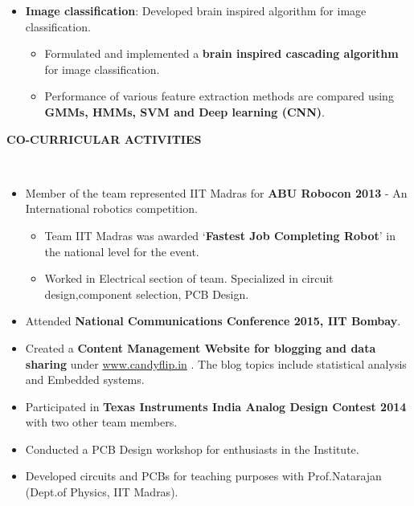 \documentclass[a4paper,10pt]{article}
\newcommand{\lsep}{-0.5cm}
\newcommand{\resheading}[1]{{\small \colorbox{mygrey}{\begin{minipage}{0.975\textwidth}{\textbf{#1 \vphantom{p\^{E}}}}\end{minipage}}}}
\begin{document}
\begin{itemize}
        \vspace{-5pt}
        \item \textbf{Image classification}: Developed brain inspired algorithm for image classification.
        \begin{itemize}
        \vspace{-5pt}
            \item Formulated and implemented a \textbf{brain inspired cascading algorithm} for image classification.
            \item Performance of various feature extraction methods are compared using \textbf{GMMs, HMMs, SVM and Deep learning (CNN)}.            
        \end{itemize}
    \end{itemize}


\resheading{\textbf{CO-CURRICULAR ACTIVITIES} }\\[\lsep]
    \begin{itemize}
        \item Member of the team represented IIT Madras for \textbf{ABU Robocon 2013} - An International robotics competition.
        \begin{itemize}
            \vspace{-5pt}
            \item Team IIT Madras was awarded `\textbf{Fastest Job Completing Robot}' in the national level for the event.
            \item  Worked in Electrical section of team. Specialized in circuit design,component selection, PCB Design.
            \vspace{-5pt}
        \end{itemize}
        \item Attended \textbf{National Communications Conference 2015, IIT Bombay}.
        \vspace{-5pt}
        \item Created a \textbf{Content Management Website for blogging and data sharing} under \hspace{3pt}\url{www.candyflip.in} . The blog topics include statistical analysis and Embedded systems.
        \vspace{-5pt}
        \item Participated in \textbf{Texas Instruments India Analog Design Contest 2014} with two other team members.
        \vspace{-5pt}       
        \item Conducted a PCB Design workshop for enthusiasts in the Institute.
        \vspace{-5pt}
        \item Developed circuits and PCBs for teaching purposes with Prof.Natarajan (Dept.of Physics, IIT Madras).
    \end{itemize}
\end{document}
